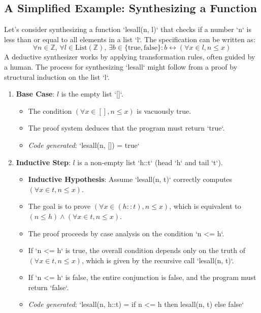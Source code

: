 \documentclass[12pt, a4paper]{report}
\begin{document}
\subsection{A Simplified Example: Synthesizing a Function}
Let's consider synthesizing a function `lesall(n, l)` that checks if a number `n` is less than or equal to all elements in a list `l`. The specification can be written as:
$$ \forall n \in \mathbb{Z}, \, \forall l \in \text{List}(\mathbb{Z}), \, \exists b \in \{\text{true}, \text{false}\} : b \leftrightarrow (\forall x \in l, n \leq x) $$
A deductive synthesizer works by applying transformation rules, often guided by a human. The process for synthesizing `lesall` might follow from a proof by structural induction on the list `l`.

\begin{enumerate}
    \item \textbf{Base Case}: $l$ is the empty list `[]`.
    \begin{itemize}
        \item The condition $(\forall x \in [], n \leq x)$ is vacuously true.
        \item The proof system deduces that the program must return `true`.
        \item \textit{Code generated}: `lesall(n, []) = true`
    \end{itemize}
    \item \textbf{Inductive Step}: $l$ is a non-empty list `h::t` (head `h` and tail `t`).
    \begin{itemize}
        \item \textbf{Inductive Hypothesis}: Assume `lesall(n, t)` correctly computes $(\forall x \in t, n \leq x)$.
        \item The goal is to prove $(\forall x \in (h::t), n \leq x)$, which is equivalent to $(n \leq h) \land (\forall x \in t, n \leq x)$.
        \item The proof proceeds by case analysis on the condition `n <= h`.
        \item If `n <= h` is true, the overall condition depends only on the truth of $(\forall x \in t, n \leq x)$, which is given by the recursive call `lesall(n, t)`.
        \item If `n <= h` is false, the entire conjunction is false, and the program must return `false`.
        \item \textit{Code generated}: `lesall(n, h::t) = if n <= h then lesall(n, t) else false`
    \end{itemize}
\end{enumerate}
\end{document}

